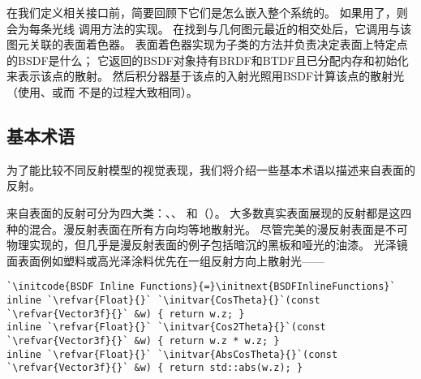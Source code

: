 在我们定义相关接口前，简要回顾下它们是怎么嵌入整个系统的。
如果用了，则会为每条光线
调用方法的实现。
在找到与几何图元最近的相交处后，它调用与该图元关联的表面着色器。
表面着色器实现为子类的方法并负责决定表面上特定点的BSDF是什么；
它返回的BSDF对象持有BRDF和BTDF且已分配内存和初始化来表示该点的散射。
然后积分器基于该点的入射光照用BSDF计算该点的散射光
（使用、或而
不是的过程大致相同）。

\subsection{基本术语}\label{sub:基本术语}
为了能比较不同反射模型的视觉表现，我们将介绍一些基本术语以描述来自表面的反射。

来自表面的反射可分为四大类：、、
和（）。
大多数真实表面展现的反射都是这四种的混合。漫反射表面在所有方向均等地散射光。
尽管完美的漫反射表面是不可物理实现的，但几乎是漫反射表面的例子包括暗沉的黑板和哑光的油漆。
光泽镜面表面例如塑料或高光泽涂料优先在一组反射方向上散射光——
\begin{lstlisting}
`\initcode{BSDF Inline Functions}{=}\initnext{BSDFInlineFunctions}`
inline `\refvar{Float}{}` `\initvar{CosTheta}{}`(const `\refvar{Vector3f}{}` &w) { return w.z; }
inline `\refvar{Float}{}` `\initvar{Cos2Theta}{}`(const `\refvar{Vector3f}{}` &w) { return w.z * w.z; }
inline `\refvar{Float}{}` `\initvar{AbsCosTheta}{}`(const `\refvar{Vector3f}{}` &w) { return std::abs(w.z); }
\end{lstlisting}


